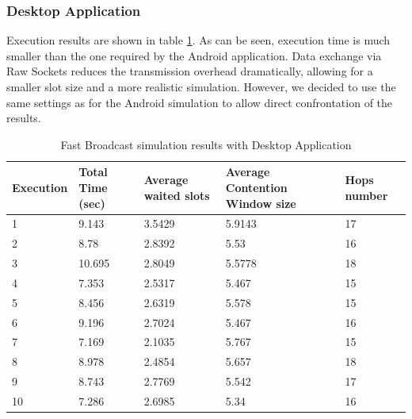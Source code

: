 \subsubsection{Desktop Application}

Execution results are shown in table \ref{tab:Desktop_res}. As can be seen, execution time is much smaller than the one required by the Android application. Data exchange via Raw Sockets reduces the transmission overhead dramatically, allowing for a smaller slot size and a more realistic simulation. However, we decided to use the same settings as for the Android simulation to allow direct confrontation of the results.

\begin{table}
\caption{Fast Broadcast simulation results with Desktop Application}
\label{tab:Desktop_res}
\centering
\begin{tabular}{|m{}|m{}|m{}|m{}|m{}|}
\hline
Execution & Total \newline Time (sec) & Average waited slots & Average Contention Window size & Hops \newline number \\
\hline
1 & 9.143	& 3.5429	& 5.9143 	& 17 \\
\hline
2 & 8.78	& 2.8392  	& 5.53 		& 16 \\
\hline
3 & 10.695 	& 2.8049	& 5.5778 	& 18 \\
\hline
4 & 7.353 	& 2.5317  	& 5.467 	& 15 \\ 
\hline
5 & 8.456	& 2.6319 	& 5.578		& 15 \\
\hline
6 & 9.196	& 2.7024 	& 5.467		& 16 \\ 
\hline
7 & 7.169	& 2.1035	& 5.767		& 15 \\
\hline
8 & 8.978	& 2.4854	& 5.657		& 18 \\
\hline
9 & 8.743	& 2.7769	& 5.542		& 17 \\
\hline
10 & 7.286	& 2.6985 	& 5.34 		& 16 \\
\hline
\end{tabular}
\end{table}  
